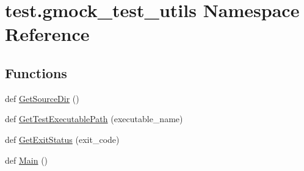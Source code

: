 \hypertarget{namespacetest_1_1gmock__test__utils}{}\section{test.\+gmock\+\_\+test\+\_\+utils Namespace Reference}
\label{namespacetest_1_1gmock__test__utils}
\subsection*{Functions}
\begin{DoxyCompactItemize}
\item 
def \mbox{\hyperlink{namespacetest_1_1gmock__test__utils_a7d61daab1cfc01ded5e90e580cd70c51}{Get\+Source\+Dir}} ()
\item 
def \mbox{\hyperlink{namespacetest_1_1gmock__test__utils_a2e91ced571e7f160fc151c2378d8f2f1}{Get\+Test\+Executable\+Path}} (executable\+\_\+name)
\item 
def \mbox{\hyperlink{namespacetest_1_1gmock__test__utils_a3fbda6599ef677f59ded8d6a617ac1c7}{Get\+Exit\+Status}} (exit\+\_\+code)
\item 
def \mbox{\hyperlink{namespacetest_1_1gmock__test__utils_ac34a409a19ef577ba2dc8bf8f5434a28}{Main}} ()
\end{DoxyCompactItemize}
